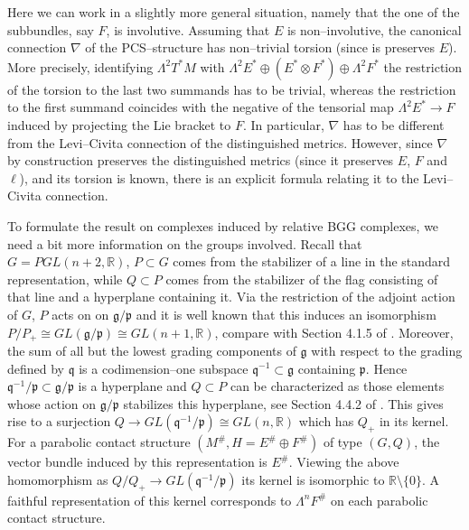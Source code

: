 \documentclass[12pt,a4paper]{amsart}
\def\frak{\mathfrak}
\def\Bbb{\mathbb}
\newcommand{\La}{\Lambda}
\numberwithin{theorem}{section}
\theoremstyle{definition}
\theoremstyle{remark}
\begin{document}
Here we can work in a slightly more general situation, namely that the
one of the subbundles, say $F$, is involutive. Assuming that $E$ is
non--involutive, the canonical connection $\nabla$ of the
PCS--structure has non--trivial torsion (since is preserves $E$). More
precisely, identifying $\La^2T^*M$ with $\La^2E^*\oplus(E^*\otimes
F^*)\oplus\La^2F^*$ the restriction of the torsion to the last two
summands has to be trivial, whereas the restriction to the first
summand coincides with the negative of the tensorial map $\La^2E^*\to
F$ induced by projecting the Lie bracket to $F$. In particular,
$\nabla$ has to be different from the Levi--Civita connection of the
distinguished metrics. However, since $\nabla$ by construction
preserves the distinguished metrics (since it preserves $E$, $F$ and
$\ell$), and its torsion is known, there is an explicit formula
relating it to the Levi--Civita connection.

To formulate the result on complexes induced by relative BGG complexes,
we need a bit more information on the groups involved. Recall that
$G=PGL(n+2,\Bbb R)$, $P\subset G$ comes from the stabilizer of a line
in the standard representation, while $Q\subset P$ comes from the
stabilizer of the flag consisting of that line and a hyperplane
containing it. Via the restriction of the adjoint action of $G$, $P$
acts on on $\frak g/\frak p$ and it is well known that this induces an
isomorphism $P/P_+\cong GL(\frak g/\frak p)\cong GL(n+1,\Bbb R)$,
compare with Section 4.1.5 of \cite{book}. Moreover, the sum of all
but the lowest grading components of $\frak g$ with respect to the
grading defined by $\frak q$ is a codimension--one subspace $\frak
q^{-1}\subset\frak g$ containing $\frak p$. Hence $\frak q^{-1}/\frak
p\subset\frak g/\frak p$ is a hyperplane and $Q\subset P$ can be
characterized as those elements whose action on $\frak g/\frak p$
stabilizes this hyperplane, see Section 4.4.2 of \cite{book}. This
gives rise to a surjection $Q\to GL(\frak q^{-1}/\frak p)\cong
GL(n,\Bbb R)$ which has $Q_+$ in its kernel. For a parabolic contact
structure $(M^\#,H=E^\#\oplus F^\#)$ of type $(G,Q)$, the vector
bundle induced by this representation is $E^\#$. Viewing the above
homomorphism as $Q/Q_+\to GL(\frak q^{-1}/\frak p)$ its kernel is
isomorphic to $\Bbb R\setminus\{0\}$. A faithful representation of
this kernel corresponds to $\La^nF^\#$ on each parabolic contact
structure.
\end{document}
